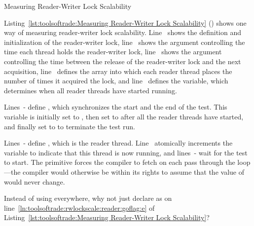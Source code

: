 \begin{listing}[tbp]

\caption{Measuring Reader-Writer Lock Scalability}
\label{lst:toolsoftrade:Measuring Reader-Writer Lock Scalability}
\end{listing}

\begin{lineref}
Listing~\ref{lst:toolsoftrade:Measuring Reader-Writer Lock Scalability}
()
shows one way of measuring reader-writer lock scalability.
Line~ shows the definition and initialization of the reader-writer
lock, line~ shows the  argument controlling the
time each thread holds the reader-writer lock,
line~ shows the  argument controlling the time between
the release of the reader-writer lock and the next acquisition,
line~ defines the  array into which each reader thread
places the number of times it acquired the lock, and
line~ defines the  variable, which
determines when all reader threads have started running.

Lines~- define ,
which synchronizes the start and the
end of the test.
This variable is initially set to , then set to
 after all the reader threads have started, and finally
set to  to terminate the test run.
\end{lineref}

\begin{lineref}
Lines~- define , which is the reader thread.
Line~ atomically increments the  variable
to indicate that this thread is now running, and
lines~- wait for the test to start.
The  primitive forces the compiler to fetch 
on each pass through the loop---the compiler would otherwise be within its
rights to assume that the value of  would never change.
\end{lineref}

\QuickQuiz{}
	Instead of using  everywhere, why not just
	declare  as  on
        line~\ref{ln:toolsoftrade:rwlockscale:reader:goflag:e} of
	Listing~\ref{lst:toolsoftrade:Measuring Reader-Writer Lock Scalability}?
 \QuickQuizEnd

